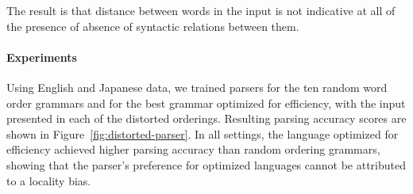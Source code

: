 \documentclass[10pt,twoside,lineno]{article}
\begin{document}
The result is that distance between words in the input is not indicative at all of the presence of absence of syntactic relations between them.

\paragraph{Experiments}
Using English and Japanese data, we trained parsers for the ten random word order grammars and for the best grammar optimized for efficiency, with the input presented in each of the distorted orderings.
Resulting parsing accuracy scores are shown in Figure~\ref{fig:distorted-parser}.
In all settings, the language optimized for efficiency achieved higher parsing accuracy than random ordering grammars, showing that the parser's preference for optimized languages cannot be attributed to a locality bias.
\end{document}
